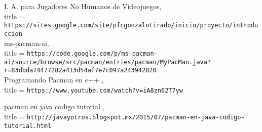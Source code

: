 \documentclass[11pt]{article}
\begin{document}
{I. A. para Jugadores No Humanos de Videojuegos,\\
  title = {\texttt{https://sites.google.com/site/pfcgonzalotirado/inicio/proyecto/introduccion}}
}\\
\linebreak
{ms-pacman-ai,\\
  title = {\texttt{https://code.google.com/p/ms-pacman-ai/source/browse/src/pacman/entries/pacman/MyPacMan.java?r=83dbda74477282a413d54af7e7c097a243942820}}
}\\
\linebreak
{Programando Pacman en c++ ,\\
  title = {\texttt{https://www.youtube.com/watch?v=iA8zn62T7yw}}
}\\
\linebreak

{pacman en java codigo tutorial ,\\
  title = {\texttt{http://javayotros.blogspot.mx/2015/07/pacman-en-java-codigo-tutorial.html}}
}
\end{document}
